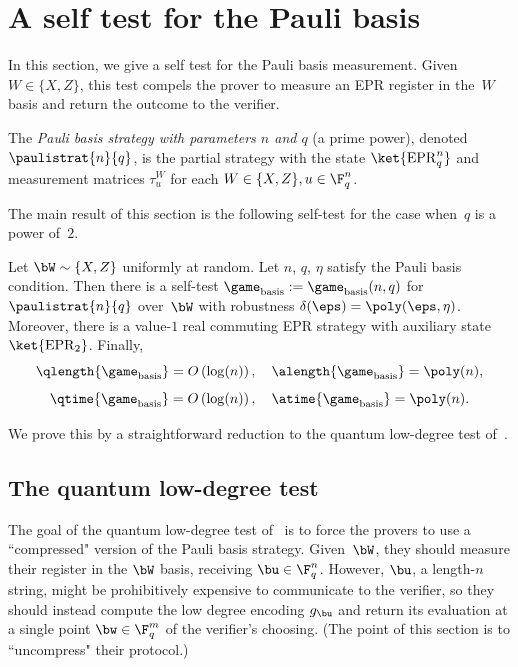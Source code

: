 \section{A self test for the Pauli basis}\label{sec:self-test-pauli}

In this section, we give a self test for the Pauli basis measurement.
Given~$W \in \{X, Z\}$, this test compels the prover
to measure an EPR register in the~$W$ basis
and return the outcome to the verifier.

\begin{definition}
The \emph{Pauli basis strategy with parameters $n$ and $q$} (a prime power),
denoted $\paulistrat{n}{q}$, is the partial strategy
with the state $\ket{\mathrm{EPR}_q^n}$ and measurement matrices $\tau^W_u$ for each $W \in \{X,Z\}, u \in \F_q^n$.
\end{definition}

The main result of this section is the following self-test for the case when~$q$ is a power of~$2$.

\begin{theorem}\label{thm:basis-test}
Let $\bW \sim \{X, Z\}$ uniformly at random.  Let $n$, $q$, $\eta$ satisfy the Pauli basis condition.
Then there is a self-test $\game_{\mathrm{basis}} := \game_{\mathrm{basis}}(n,q)$ for $\paulistrat{n}{q}$ over~$\bW$
with robustness $\delta(\eps) = \poly(\eps, \eta)$.
Moreover, there is a value-$1$ real commuting EPR strategy with auxiliary state $\ket{\mathrm{EPR}_2}$.
Finally,
\begin{equation*}
\qlength{\game_{\mathrm{basis}}} = O\left(\log(n)\right),
\quad
\alength{\game_{\mathrm{basis}}} = \poly(n),
\end{equation*}
\begin{equation*}
\qtime{\game_{\mathrm{basis}}} = O\left(\log(n)\right),
\quad
\atime{\game_{\mathrm{basis}}} = \poly(n).
\end{equation*}
\end{theorem}

We prove this by a straightforward reduction to the quantum low-degree test of~\cite{NV18a}.

\subsection{The quantum low-degree test}

The goal of the quantum low-degree test of~\cite{NV18a}
is to force the provers to use a ``compressed" version of the Pauli basis strategy.
Given~$\bW$, they should measure their register in the $\bW$ basis, receiving $\bu \in \F_q^n$.
However, $\bu$, a length-$n$ string, might be prohibitively expensive to communicate to the verifier,
so they should instead compute the low degree encoding $g_{\bu}$
and return its evaluation at a single point $\bw \in \F_q^m$ of the verifier's choosing.
(The point of this section is to ``uncompress" their protocol.)

